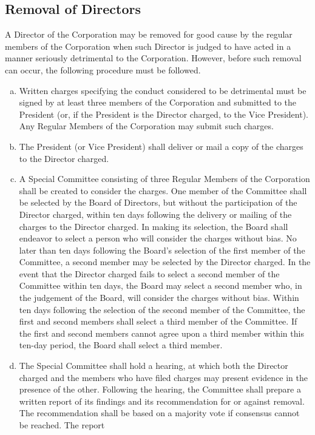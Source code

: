\subsection{Removal of Directors}
A Director of the Corporation may be removed for good cause by the
regular members of the Corporation when such Director is judged to
have acted in a manner seriously detrimental to the
Corporation. However, before such removal can occur, the following
procedure must be followed.
\begin{enumerate}[a.]
\item Written charges specifying the conduct considered to be
  detrimental must be signed by at least three members of the
  Corporation and submitted to the President (or, if the President is
  the Director charged, to the Vice President). Any Regular Members of
  the Corporation may submit such charges.
\item The President (or Vice President) shall deliver or mail a copy
  of the charges to the Director charged.
\item A Special Committee consisting of three Regular Members of the
  Corporation shall be created to consider the charges. One member of
  the Committee shall be selected by the Board of Directors, but
  without the participation of the Director charged, within ten days
  following the delivery or mailing of the charges to the Director
  charged. In making its selection, the Board shall endeavor to select
  a person who will consider the charges without bias. No later than
  ten days following the Board’s selection of the first member of the
  Committee, a second member may be selected by the Director
  charged. In the event that the Director charged fails to select a
  second member of the Committee within ten days, the Board may select
  a second member who, in the judgement of the Board, will consider
  the charges without bias. Within ten days following the selection of
  the second member of the Committee, the first and second members
  shall select a third member of the Committee. If the first and
  second members cannot agree upon a third member within this ten-day
  period, the Board shall select a third member.
\item The Special Committee shall hold a hearing, at which both the
  Director charged and the members who have filed charges may present
  evidence in the presence of the other. Following the hearing, the
  Committee shall prepare a written report of its findings and its
  recommendation for or against removal. The recommendation shall be
  based on a majority vote if consensus cannot be reached. The report

\end{enumerate}
